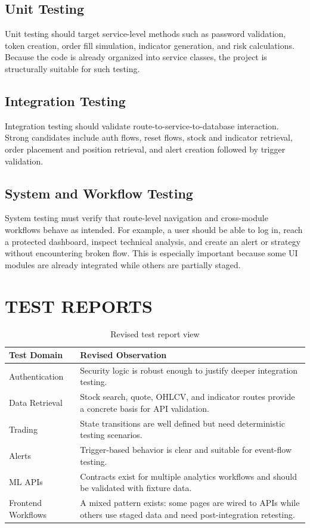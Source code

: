 \documentclass[12pt,a4paper]{report}
\begin{document}
\subsection{Unit Testing}
Unit testing should target service-level methods such as password validation, token creation, order fill simulation, indicator generation, and risk calculations. Because the code is already organized into service classes, the project is structurally suitable for such testing.

\subsection{Integration Testing}
Integration testing should validate route-to-service-to-database interaction. Strong candidates include auth flows, reset flows, stock and indicator retrieval, order placement and position retrieval, and alert creation followed by trigger validation.

\subsection{System and Workflow Testing}
System testing must verify that route-level navigation and cross-module workflows behave as intended. For example, a user should be able to log in, reach a protected dashboard, inspect technical analysis, and create an alert or strategy without encountering broken flow. This is especially important because some UI modules are already integrated while others are partially staged.

\section{TEST REPORTS}
\begin{table}[H]
\centering
\caption{Revised test report view}
\begin{tabularx}{\textwidth}{>{\raggedright\arraybackslash}p{2.1in} X}
\toprule
\textbf{Test Domain} & \textbf{Revised Observation} \\
\midrule
Authentication & Security logic is robust enough to justify deeper integration testing. \\
Data Retrieval & Stock search, quote, OHLCV, and indicator routes provide a concrete basis for API validation. \\
Trading & State transitions are well defined but need deterministic testing scenarios. \\
Alerts & Trigger-based behavior is clear and suitable for event-flow testing. \\
ML APIs & Contracts exist for multiple analytics workflows and should be validated with fixture data. \\
Frontend Workflows & A mixed pattern exists: some pages are wired to APIs while others use staged data and need post-integration retesting. \\
\bottomrule
\end{tabularx}
\end{table}
\end{document}
